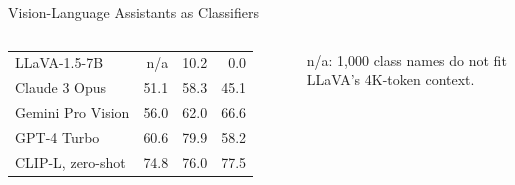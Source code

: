 \begin{frame}{Vision-Language Assistants as Classifiers}
\begin{columns}[T,onlytextwidth]
{\begin{tabular}{l r r r}
        \midrule
        LLaVA-1.5-7B & n/a & 10.2 & 0.0 \\
        Claude 3 Opus & 51.1 & 58.3 & 45.1 \\
        Gemini Pro Vision & 56.0 & 62.0 & 66.6 \\
        GPT-4 Turbo & 60.6 & 79.9 & 58.2 \\
        CLIP-L, zero-shot & 74.8 & 76.0 & 77.5 \\
        \bottomrule
      \end{tabular}\par}
      {\scriptsize n/a: 1,000 class names do not fit LLaVA's 4K-token context.\par}
  \end{columns}
\end{frame}
